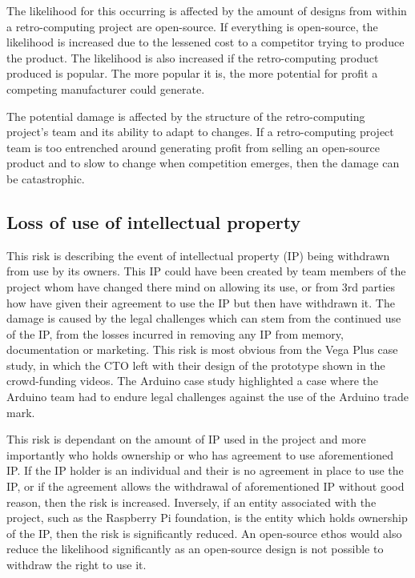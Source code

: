 The likelihood for this occurring is affected by the amount of designs from within a retro-computing project are open-source. If everything is open-source, the likelihood is increased due to the lessened cost to a competitor trying to produce the product. The likelihood is also increased if the retro-computing product produced is popular. The more popular it is, the more potential for profit a competing manufacturer could generate.

The potential damage is affected by the structure of the retro-computing project's team and its ability to adapt to changes. If a retro-computing project team is too entrenched around generating profit from selling an open-source product and to slow to change when competition emerges, then the damage can be catastrophic.  


\subsection{Loss of use of intellectual property}
This risk is describing the event of intellectual property (IP) being withdrawn from use by its owners. This IP could have been created by team members of the project whom have changed there mind on allowing its use, or from 3rd parties how have given their agreement to use the IP but then have withdrawn it. The damage is caused by the legal challenges which can stem from the continued use of the IP, from the losses incurred in removing any IP from memory, documentation or marketing. This risk is most obvious from the Vega Plus case study, in which the CTO left with their design of the prototype shown in the crowd-funding videos. The Arduino case study highlighted a case where the Arduino team had to endure legal challenges against the use of the Arduino trade mark. 

This risk is dependant on the amount of IP used in the project and more importantly who holds ownership or who has agreement to use aforementioned IP. If the IP holder is an individual and their is no agreement in place to use the IP, or if the agreement allows the withdrawal of aforementioned IP without good reason, then the risk is increased. Inversely, if an entity associated with the project, such as the Raspberry Pi foundation, is the entity which holds ownership of the IP, then the risk is significantly reduced. An open-source ethos would also reduce the likelihood significantly as an open-source design is not possible to withdraw the right to use it. \\

